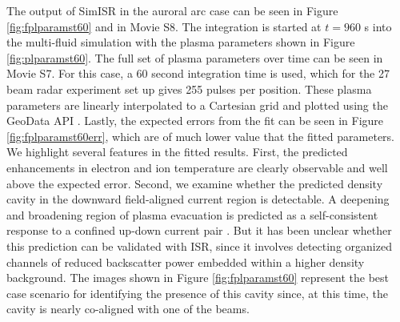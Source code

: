 \documentclass[draft,ras]{agutex}
\begin{document}
\begin{article}
The output of SimISR in the auroral arc case can be seen in Figure \ref{fig:fplparamst60} and in Movie S8. The integration is started at $t=960$ s into the multi-fluid simulation with the plasma parameters shown in Figure \ref{fig:plparamst60}. The full set of plasma parameters over time can be seen in Movie S7. For this case, a 60 second integration time is used, which for the 27 beam radar experiment set up gives 255 pulses per position. These plasma parameters are linearly interpolated to a Cartesian grid and plotted using the GeoData API \citep{john_swoboda_2016_154533}. Lastly, the expected errors from the fit can be seen in Figure \ref{fig:fplparamst60err}, which are of much lower value that the fitted parameters.
We highlight several features in the fitted results. First, the predicted enhancements in electron and ion temperature are clearly observable and well above the expected error. Second, we examine whether the predicted density cavity in the downward field-aligned current region is  detectable. A deepening and broadening region of plasma evacuation is predicted as a self-consistent response to a confined up-down current pair \citep[e.g.,][]{cran;cavity}.  But it has been unclear whether this prediction can be validated with ISR, since it involves detecting organized channels of reduced backscatter power embedded within a higher density background.
The images shown in Figure \ref{fig:fplparamst60} represent the best case scenario for identifying the presence of this cavity since, at this time, the cavity is nearly co-aligned with one of the beams. 

\end{article}
\end{document}
